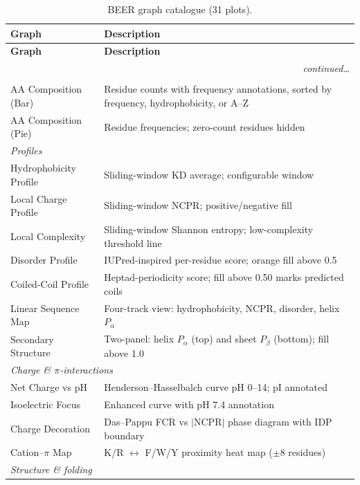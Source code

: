 \documentclass[12pt]{article}
\begin{document}
\begin{longtable}{p{4.5cm}p{9.5cm}}
\caption{BEER graph catalogue (31 plots).}
\label{tab:graphs}\\
\toprule
\textbf{Graph} & \textbf{Description} \\
\midrule
\endfirsthead
\toprule
\textbf{Graph} & \textbf{Description} \\
\midrule
\endhead
\midrule
\multicolumn{2}{r}{\itshape continued\ldots}\\
\endfoot
\bottomrule
\endlastfoot
%
\multicolumn{2}{l}{\textit{Composition}}\\
AA Composition (Bar)         & Residue counts with frequency annotations, sorted by frequency, hydrophobicity, or A--Z \\
AA Composition (Pie)         & Residue frequencies; zero-count residues hidden \\
\midrule
\multicolumn{2}{l}{\textit{Profiles}}\\
Hydrophobicity Profile       & Sliding-window KD average; configurable window \\
Local Charge Profile         & Sliding-window NCPR; positive/negative fill \\
Local Complexity             & Sliding-window Shannon entropy; low-complexity threshold line \\
Disorder Profile             & IUPred-inspired per-residue score; orange fill above 0.5 \\
Coiled-Coil Profile          & Heptad-periodicity score; fill above 0.50 marks predicted coils \\
Linear Sequence Map          & Four-track view: hydrophobicity, NCPR, disorder, helix $P_\alpha$ \\
Secondary Structure          & Two-panel: helix $P_\alpha$ (top) and sheet $P_\beta$ (bottom); fill above 1.0 \\
\midrule
\multicolumn{2}{l}{\textit{Charge \& $\pi$-interactions}}\\
Net Charge vs pH             & Henderson--Hasselbalch curve pH 0--14; pI annotated \\
Isoelectric Focus            & Enhanced curve with pH 7.4 annotation \\
Charge Decoration            & Das--Pappu FCR vs $|$NCPR$|$ phase diagram with IDP boundary \\
Cation--$\pi$ Map            & K/R $\leftrightarrow$ F/W/Y proximity heat map ($\pm$8 residues) \\
\midrule
\multicolumn{2}{l}{\textit{Structure \& folding}}\\

\end{longtable}
\end{document}
